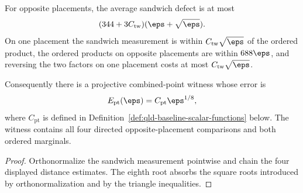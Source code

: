 \begin{theorem}
\label{thm:qld-combined-points-explicit}
\leanok
{}
For opposite placements, the average sandwich defect is at most
\[
  (344+3C_{\mathrm{tw}})(\eps+\sqrt\eps).
\]
On one placement the sandwich measurement is within
$C_{\mathrm{tw}}\sqrt\eps$ of the ordered product, the ordered products on
opposite placements are within $688\eps$, and reversing the two factors on one
placement costs at most $C_{\mathrm{tw}}\sqrt\eps$.

Consequently there is a projective combined-point witness whose error is
\[
  E_{\mathrm{pt}}(\eps)=C_{\mathrm{pt}}\eps^{1/8},
\]
where $C_{\mathrm{pt}}$ is defined in
Definition~\ref{def:qld-baseline-scalar-functions} below.  The witness contains
all four directed opposite-placement comparisons and both ordered marginals.
\end{theorem}
\begin{proof}
\leanok
Orthonormalize the sandwich measurement pointwise and chain the four displayed
distance estimates.  The eighth root absorbs the square roots introduced by
orthonormalization and by the triangle inequalities.
\end{proof}

